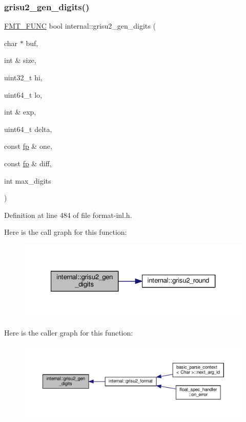 \subsubsection{\texorpdfstring{grisu2\+\_\+gen\+\_\+digits()}{grisu2\_gen\_digits()}}
{\footnotesize\ttfamily \hyperlink{format_8h_a02c8898388e0ae59aab58be14fcd4e05}{F\+M\+T\+\_\+\+F\+U\+NC} bool internal\+::grisu2\+\_\+gen\+\_\+digits (\begin{DoxyParamCaption}\item[{char $\ast$}]{buf,  }\item[{int \&}]{size,  }\item[{uint32\+\_\+t}]{hi,  }\item[{uint64\+\_\+t}]{lo,  }\item[{int \&}]{exp,  }\item[{uint64\+\_\+t}]{delta,  }\item[{const \hyperlink{classinternal_1_1fp}{fp} \&}]{one,  }\item[{const \hyperlink{classinternal_1_1fp}{fp} \&}]{diff,  }\item[{int}]{max\+\_\+digits }\end{DoxyParamCaption})}



Definition at line 484 of file format-\/inl.\+h.

Here is the call graph for this function\+:
\nopagebreak
\begin{figure}[H]
\begin{center}
\leavevmode
\includegraphics[width=327pt]{namespaceinternal_a654d8a0809bb6e5db2deacf15b2971a2_cgraph}
\end{center}
\end{figure}
Here is the caller graph for this function\+:
\nopagebreak
\begin{figure}[H]
\begin{center}
\leavevmode
\includegraphics[width=350pt]{namespaceinternal_a654d8a0809bb6e5db2deacf15b2971a2_icgraph}
\end{center}
\end{figure}
\mbox{\label{namespaceinternal_a868ca3301073105fcbd25d79ff98ca16}} 
